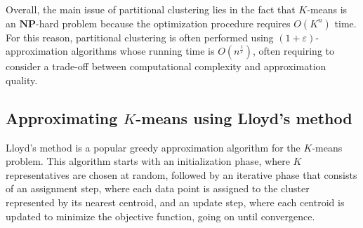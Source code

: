 \documentclass{report}
\begin{document}
\noindent Overall, the main issue of partitional clustering lies in the fact that $\displaystyle K$-means is an $\displaystyle \mathbf{NP}$-hard problem because the optimization procedure requires $\displaystyle O(K^n)$ time. \newline
For this reason, partitional clustering is often performed using $\displaystyle (1 + \varepsilon)$-approximation algorithms whose running time is $\displaystyle O(n^{\frac{1}{\varepsilon}})$, often requiring to consider a trade-off between computational complexity and approximation quality.
\subsection{Approximating $K$-means using Lloyd's method}
Lloyd's method is a popular greedy approximation algorithm for the $\displaystyle K$-means problem. \newline
This algorithm starts with an initialization phase, where $\displaystyle K$ representatives are chosen at random, followed by an iterative phase that consists of an assignment step, where each data point is assigned to the cluster represented by its nearest centroid, and an update step, where each centroid is updated to minimize the objective function, going on until convergence.
\end{document}
